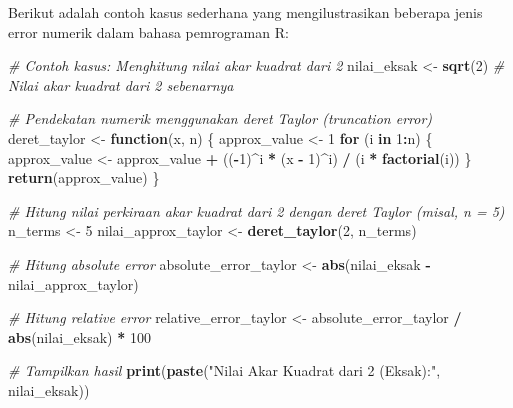 \documentclass[
]{book}
\newenvironment{Shaded}{\begin{snugshade}}{\end{snugshade}}
\newcommand{\CommentTok}[1]{\textcolor[rgb]{0.56,0.35,0.01}{\textit{#1}}}
\newcommand{\ControlFlowTok}[1]{\textcolor[rgb]{0.13,0.29,0.53}{\textbf{#1}}}
\newcommand{\DecValTok}[1]{\textcolor[rgb]{0.00,0.00,0.81}{#1}}
\newcommand{\FunctionTok}[1]{\textcolor[rgb]{0.13,0.29,0.53}{\textbf{#1}}}
\newcommand{\NormalTok}[1]{#1}
\newcommand{\OtherTok}[1]{\textcolor[rgb]{0.56,0.35,0.01}{#1}}
\newcommand{\SpecialCharTok}[1]{\textcolor[rgb]{0.81,0.36,0.00}{\textbf{#1}}}
\newcommand{\StringTok}[1]{\textcolor[rgb]{0.31,0.60,0.02}{#1}}
\theoremstyle{definition}
\theoremstyle{definition}
\theoremstyle{definition}
\theoremstyle{definition}
\theoremstyle{remark}
\begin{document}
Berikut adalah contoh kasus sederhana yang mengilustrasikan beberapa jenis error numerik dalam bahasa pemrograman R:

\begin{Shaded}
\begin{Highlighting}[]
\CommentTok{\# Contoh kasus: Menghitung nilai akar kuadrat dari 2}
\NormalTok{nilai\_eksak }\OtherTok{\textless{}{-}} \FunctionTok{sqrt}\NormalTok{(}\DecValTok{2}\NormalTok{)  }\CommentTok{\# Nilai akar kuadrat dari 2 sebenarnya}

\CommentTok{\# Pendekatan numerik menggunakan deret Taylor (truncation error)}
\NormalTok{deret\_taylor }\OtherTok{\textless{}{-}} \ControlFlowTok{function}\NormalTok{(x, n) \{}
\NormalTok{  approx\_value }\OtherTok{\textless{}{-}} \DecValTok{1}
  \ControlFlowTok{for}\NormalTok{ (i }\ControlFlowTok{in} \DecValTok{1}\SpecialCharTok{:}\NormalTok{n) \{}
\NormalTok{    approx\_value }\OtherTok{\textless{}{-}}\NormalTok{ approx\_value }\SpecialCharTok{+}\NormalTok{ ((}\SpecialCharTok{{-}}\DecValTok{1}\NormalTok{)}\SpecialCharTok{\^{}}\NormalTok{i }\SpecialCharTok{*}\NormalTok{ (x }\SpecialCharTok{{-}} \DecValTok{1}\NormalTok{)}\SpecialCharTok{\^{}}\NormalTok{i) }\SpecialCharTok{/}\NormalTok{ (i }\SpecialCharTok{*} \FunctionTok{factorial}\NormalTok{(i))}
\NormalTok{  \}}
  \FunctionTok{return}\NormalTok{(approx\_value)}
\NormalTok{\}}

\CommentTok{\# Hitung nilai perkiraan akar kuadrat dari 2 dengan deret Taylor (misal, n = 5)}
\NormalTok{n\_terms }\OtherTok{\textless{}{-}} \DecValTok{5}
\NormalTok{nilai\_approx\_taylor }\OtherTok{\textless{}{-}} \FunctionTok{deret\_taylor}\NormalTok{(}\DecValTok{2}\NormalTok{, n\_terms)}

\CommentTok{\# Hitung absolute error}
\NormalTok{absolute\_error\_taylor }\OtherTok{\textless{}{-}} \FunctionTok{abs}\NormalTok{(nilai\_eksak }\SpecialCharTok{{-}}\NormalTok{ nilai\_approx\_taylor)}

\CommentTok{\# Hitung relative error}
\NormalTok{relative\_error\_taylor }\OtherTok{\textless{}{-}}\NormalTok{ absolute\_error\_taylor }\SpecialCharTok{/} \FunctionTok{abs}\NormalTok{(nilai\_eksak) }\SpecialCharTok{*} \DecValTok{100}

\CommentTok{\# Tampilkan hasil}
\FunctionTok{print}\NormalTok{(}\FunctionTok{paste}\NormalTok{(}\StringTok{"Nilai Akar Kuadrat dari 2 (Eksak):"}\NormalTok{, nilai\_eksak))}
\end{Highlighting}
\end{Shaded}
\end{document}
